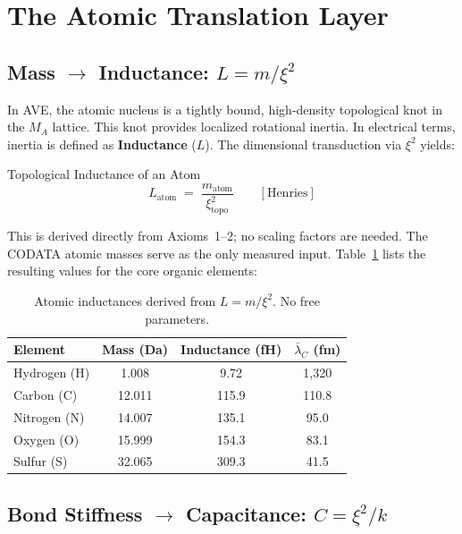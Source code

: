 \section{The Atomic Translation Layer}

\subsection{Mass $\rightarrow$ Inductance:  $L = m / \xi^2$}

In AVE, the atomic nucleus is a tightly bound, high-density topological knot in the $M_A$ lattice. This knot provides localized rotational inertia. In electrical terms, inertia is defined as \textbf{Inductance} ($L$). The dimensional transduction via $\xi^2$ yields:
\begin{resultbox}{Topological Inductance of an Atom}
\begin{equation}
    L_\text{atom} \;=\; \frac{m_\text{atom}}{\xi^2_\text{topo}}
    \qquad [\text{Henries}]
    \label{eq:L_atom}
\end{equation}
\end{resultbox}
This is derived directly from Axioms~1--2; no scaling factors are needed. The CODATA atomic masses serve as the only measured input. Table~\ref{tab:inductances} lists the resulting values for the core organic elements:

\begin{table}[h]
\centering
\begin{tabular}{lccc}
\hline
\textbf{Element} & \textbf{Mass (Da)} & \textbf{Inductance (fH)} & \textbf{$\bar{\lambda}_C$ (fm)} \\
\hline
Hydrogen (H) & 1.008 & 9.72 & 1,320 \\
Carbon (C)   & 12.011 & 115.9 & 110.8 \\
Nitrogen (N) & 14.007 & 135.1 & 95.0 \\
Oxygen (O)   & 15.999 & 154.3 & 83.1 \\
Sulfur (S)   & 32.065 & 309.3 & 41.5 \\
\hline
\end{tabular}
\caption{Atomic inductances derived from $L = m / \xi^2$. No free parameters.}
\label{tab:inductances}
\end{table}

\subsection{Bond Stiffness $\rightarrow$ Capacitance:  $C = \xi^2 / k$}

